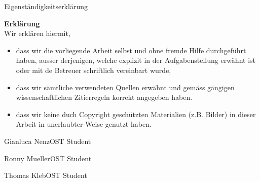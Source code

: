 Eigenständigkeitserklärung

\vspace{2 cm}

\noindent \textbf{Erklärung} \\
Wir erklären hiermit, \\

\begin{itemize}
    \item dass wir die vorliegende Arbeit selbst und ohne fremde Hilfe durchgeführt haben, ausser derjenigen, welche explizit in der Aufgabenstellung erwähnt ist oder mit de Betreuer schriftlich vereinbart wurde,
    \item dass wir sämtliche verwendeten Quellen erwähnt und gemäss gängigen wissen\-schaftlichen Zitierregeln korrekt angegeben haben.
    \item dass wir keine duch Copyright geschützten Materialien (z.B. Bilder) in dieser Arbeit in unerlaubter Weise genutzt haben.
\end{itemize}

\signature{resources/sig_ivan.png}{Gianluca Nenz}{OST Student}\hfill\signature{resources/sig_ivan.png}{Ronny Mueller}{OST Student}

\signature{resources/sig_ivan.png}{Thomas Kleb}{OST Student}

